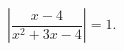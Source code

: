 \begin{ex}[type=equation]
	\begin{condition}
		$\left | \dfrac{x - 4}{x^2 + 3x - 4}\right| = 1.$
	\end{condition}
\end{ex}